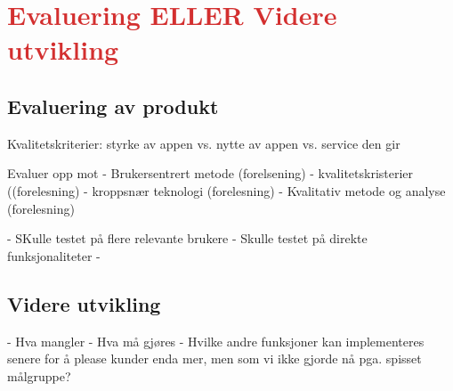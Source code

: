 \section{\textcolor[HTML]{D32F2F}{Evaluering ELLER Videre utvikling}}

\subsection{Evaluering av produkt}

Kvalitetskriterier: styrke av appen vs. nytte av appen vs. service den gir

Evaluer opp mot 
- Brukersentrert metode (forelsening)
- kvalitetskristerier ((forelesning)
- kroppsnær teknologi (forelesning)
- Kvalitativ metode og analyse (forelesning)

- SKulle testet på flere relevante brukere
- Skulle testet på direkte funksjonaliteter 
- 

\subsection{Videre utvikling}

- Hva mangler
- Hva må gjøres
- Hvilke andre funksjoner kan implementeres senere for å please kunder enda mer, men som vi ikke gjorde nå pga. spisset målgruppe?

